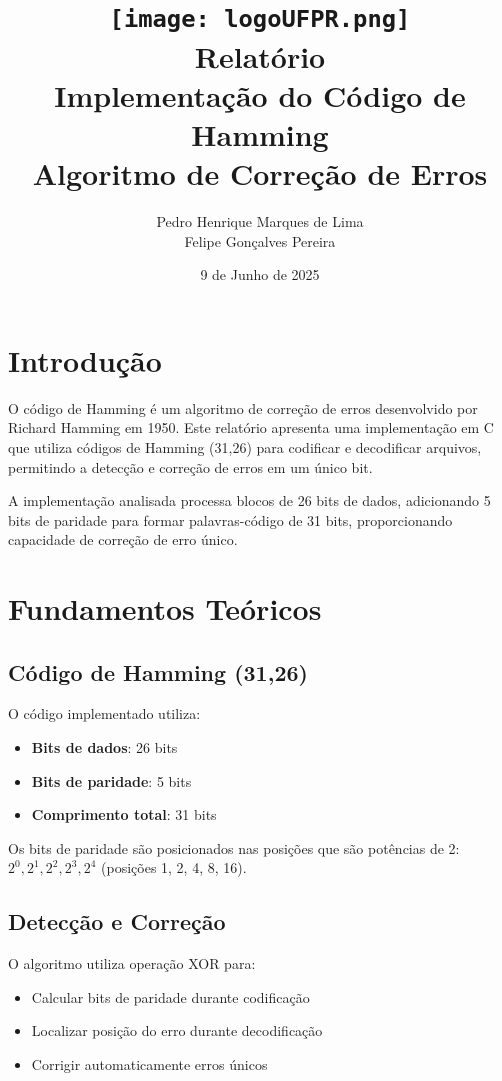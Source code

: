 \documentclass[12pt,a4paper]{article}
\title{
    \texttt{[image: logoUFPR.png]} \\
    \vspace*{0.5cm}
    {\huge\bfseries Relatório} \\
    \vspace*{0.5cm}
    {\Large Implementação do Código de Hamming} \\
    \vspace*{0.5cm}
    {\normalsize Algoritmo de Correção de Erros} \\
    \vspace*{3cm}
}
\author{Pedro Henrique Marques de Lima \\ Felipe Gonçalves Pereira}
\date{9 de Junho de 2025}
\begin{document}
\maketitle

\newpage
\tableofcontents
\newpage

\section{Introdução}

O código de Hamming é um algoritmo de correção de erros desenvolvido por Richard Hamming em 1950. Este relatório apresenta uma implementação em C que utiliza códigos de Hamming (31,26) para codificar e decodificar arquivos, permitindo a detecção e correção de erros em um único bit.

A implementação analisada processa blocos de 26 bits de dados, adicionando 5 bits de paridade para formar palavras-código de 31 bits, proporcionando capacidade de correção de erro único.

\section{Fundamentos Teóricos}

\subsection{Código de Hamming (31,26)}
O código implementado utiliza:
\begin{itemize}
    \item \textbf{Bits de dados}: 26 bits
    \item \textbf{Bits de paridade}: 5 bits
    \item \textbf{Comprimento total}: 31 bits
\end{itemize}

Os bits de paridade são posicionados nas posições que são potências de 2: $2^0, 2^1, 2^2, 2^3, 2^4$ (posições 1, 2, 4, 8, 16).

\subsection{Detecção e Correção}
O algoritmo utiliza operação XOR para:
\begin{itemize}
    \item Calcular bits de paridade durante codificação
    \item Localizar posição do erro durante decodificação
    \item Corrigir automaticamente erros únicos
\end{itemize}
\end{document}
